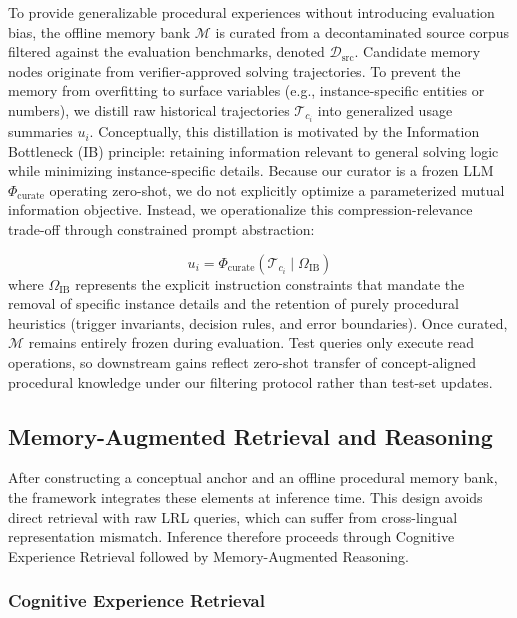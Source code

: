 \documentclass[11pt]{article}
\begin{document}
To provide generalizable procedural experiences without introducing evaluation bias, the offline memory bank $\mathcal{M}$ is curated from a decontaminated source corpus filtered against the evaluation benchmarks, denoted $\mathcal{D}_{\mathrm{src}}$.
Candidate memory nodes originate from verifier-approved solving trajectories. 
To prevent the memory from overfitting to surface variables (e.g., instance-specific entities or numbers), we distill raw historical trajectories $\mathcal{T}_{c_i}$ into generalized usage summaries $u_i$.
Conceptually, this distillation is motivated by the Information Bottleneck (IB) principle: retaining information relevant to general solving logic while minimizing instance-specific details.
Because our curator is a frozen LLM $\Phi_{\mathrm{curate}}$ operating zero-shot, we do not explicitly optimize a parameterized mutual information objective.
Instead, we operationalize this compression-relevance trade-off through constrained prompt abstraction:

\begin{equation}
    u_i = \Phi_{\mathrm{curate}}(\mathcal{T}_{c_i} \mid \Omega_{\mathrm{IB}})
\end{equation}
where $\Omega_{\mathrm{IB}}$ represents the explicit instruction constraints that mandate the removal of specific instance details and the retention of purely procedural heuristics (trigger invariants, decision rules, and error boundaries).
Once curated, $\mathcal{M}$ remains entirely frozen during evaluation. 
Test queries only execute read operations, so downstream gains reflect zero-shot transfer of concept-aligned procedural knowledge under our filtering protocol rather than test-set updates.

\subsection{Memory-Augmented Retrieval and Reasoning}

After constructing a conceptual anchor and an offline procedural memory bank, the framework integrates these elements at inference time.
This design avoids direct retrieval with raw LRL queries, which can suffer from cross-lingual representation mismatch.
Inference therefore proceeds through Cognitive Experience Retrieval followed by Memory-Augmented Reasoning.

\subsubsection{Cognitive Experience Retrieval}
\end{document}
